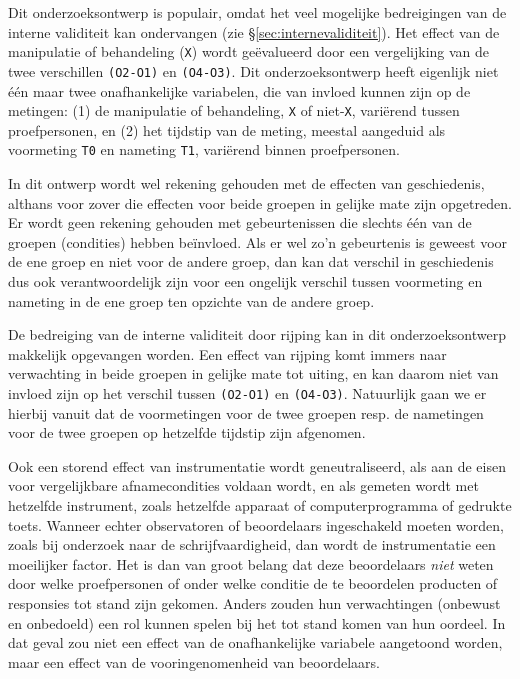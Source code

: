\documentclass[
]{book}
\begin{document}
Dit onderzoeksontwerp is populair, omdat het veel mogelijke bedreigingen
van de interne validiteit kan ondervangen (zie
§\ref{sec:internevaliditeit}). Het effect van de manipulatie of
behandeling (\texttt{X}) wordt geëvalueerd door een vergelijking van de twee
verschillen \texttt{(O2-O1)} en \texttt{(O4-O3)}. Dit onderzoeksontwerp heeft
eigenlijk niet één maar twee onafhankelijke variabelen, die van invloed
kunnen zijn op de metingen: (1) de manipulatie of behandeling, \texttt{X} of
niet-\texttt{X}, variërend tussen proefpersonen, en (2) het tijdstip van de
meting, meestal aangeduid als voormeting \texttt{T0} en nameting \texttt{T1},
variërend binnen proefpersonen.

In dit ontwerp wordt wel rekening gehouden met de effecten van
geschiedenis, althans voor zover die effecten voor beide groepen in
gelijke mate zijn opgetreden. Er wordt geen rekening gehouden met
gebeurtenissen die slechts één van de groepen (condities) hebben
beïnvloed. Als er wel zo'n gebeurtenis is geweest voor de ene groep en
niet voor de andere groep, dan kan dat verschil in geschiedenis dus ook
verantwoordelijk zijn voor een ongelijk verschil tussen voormeting en
nameting in de ene groep ten opzichte van de andere groep.

De bedreiging van de interne validiteit door rijping kan in dit
onderzoeksontwerp makkelijk opgevangen worden. Een effect van rijping
komt immers naar verwachting in beide groepen in gelijke mate tot
uiting, en kan daarom niet van invloed zijn op het verschil tussen
\texttt{(O2-O1)} en \texttt{(O4-O3)}. Natuurlijk gaan we er hierbij vanuit dat de
voormetingen voor de twee groepen resp. de nametingen voor de twee
groepen op hetzelfde tijdstip zijn afgenomen.

Ook een storend effect van instrumentatie wordt geneutraliseerd, als aan
de eisen voor vergelijkbare afnamecondities voldaan wordt, en als
gemeten wordt met hetzelfde instrument, zoals hetzelfde apparaat of
computerprogramma of gedrukte toets. Wanneer echter observatoren of
beoordelaars ingeschakeld moeten worden, zoals bij onderzoek naar de
schrijfvaardigheid, dan wordt de instrumentatie een moeilijker factor.
Het is dan van groot belang dat deze beoordelaars \emph{niet} weten door
welke proefpersonen of onder welke conditie de te beoordelen producten
of responsies tot stand zijn gekomen. Anders zouden hun verwachtingen
(onbewust en onbedoeld) een rol kunnen spelen bij het tot stand komen
van hun oordeel. In dat geval zou niet een effect van de onafhankelijke
variabele aangetoond worden, maar een effect van de vooringenomenheid
van beoordelaars.
\end{document}
